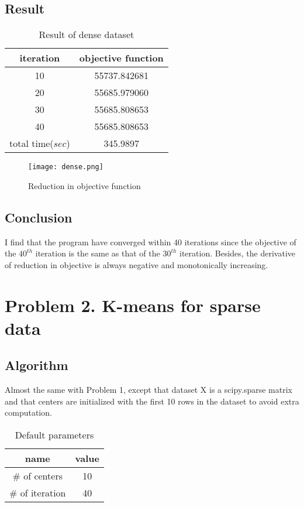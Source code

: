 \documentclass[a4paper,11pt]{article}
\begin{document}
\subsection{Result}
\begin{table}[H]
	\begin{center}
		\caption{Result of dense dataset}
		\begin{tabular}{cc}
			\toprule[2pt] 
			iteration & objective function\\
			\hline
			10		  &	55737.842681\\
			20		  &	55685.979060\\
			30		  &	55685.808653\\
			40		  &	55685.808653\\
			\hline
			total time($sec$)&345.9897\\
			\bottomrule[2pt]
		\end{tabular} 
	\end{center}
\end{table}
\begin{figure}[H]
	\centering
		\centering
		\texttt{[image: dense.png]}
	\caption{Reduction in objective function}
\end{figure}
\subsection{Conclusion}
I find that the program have converged within 40 iterations since the objective of the $40^{th}$ iteration is the same as that of the $30^{th}$ iteration. Besides, the derivative of reduction in objective is always negative and monotonically increasing.\par
\section{Problem 2. K-means for sparse data}
\subsection{Algorithm}
Almost the same with Problem 1, except that dataset X is a scipy.sparse matrix and that centers are initialized with the first 10 rows in the dataset to avoid extra computation.\par
\begin{table}[H]
\begin{center}
	\caption{Default parameters}
	\begin{tabular}{cc}
		\toprule[2pt] 
		name & value\\
		\hline
		$\#$ of centers&10\\
		$\#$ of iteration&40\\
		\bottomrule[2pt]
	\end{tabular} 
\end{center}
\end{table}
\end{document}
